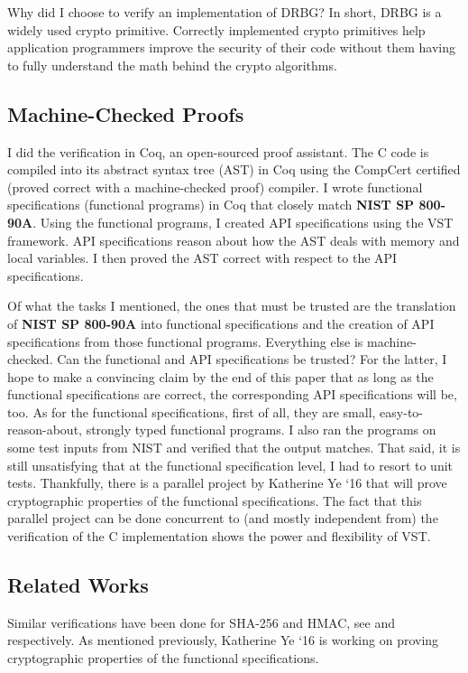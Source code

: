 \documentclass[pageno]{jpaper}
\newcommand{\stdtitle}[1]{\textbf{#1}}
\begin{document}
Why did I choose to verify an implementation of DRBG? In short, DRBG is a widely used crypto primitive. Correctly implemented crypto primitives help application programmers improve the security of their code without them having to fully understand the math behind the crypto algorithms.

\subsection{Machine-Checked Proofs}
I did the verification in Coq, an open-sourced proof assistant. The C code is compiled into its abstract syntax tree (AST) in Coq using the CompCert certified (proved correct with a machine-checked proof) compiler. I wrote functional specifications (functional programs) in Coq that closely match \stdtitle{NIST SP 800-90A}. Using the functional programs, I created API specifications using the VST framework. API specifications reason about how the AST deals with memory and local variables. I then proved the AST correct with respect to the API specifications.

Of what the tasks I mentioned, the ones that must be trusted are the translation of \stdtitle{NIST SP 800-90A} into functional specifications and the creation of API specifications from those functional programs. Everything else is machine-checked. Can the functional and API specifications be trusted? For the latter, I hope to make a convincing claim by the end of this paper that as long as the functional specifications are correct, the corresponding API specifications will be, too. As for the functional specifications, first of all, they are small, easy-to-reason-about, strongly typed functional programs. I also ran the programs on some test inputs from NIST and verified that the output matches. That said, it is still unsatisfying that at the functional specification level, I had to resort to unit tests. Thankfully, there is a parallel project by Katherine Ye ‘16 that will prove cryptographic properties of the functional specifications. The fact that this parallel project can be done concurrent to (and mostly independent from) the verification of the C implementation shows the power and flexibility of VST.

\subsection{Related Works}
Similar verifications have been done for SHA-256 and HMAC, see \cite{sha} and \cite{hmac} respectively. As mentioned previously, Katherine Ye ‘16 is working on proving cryptographic properties of the functional specifications.
\end{document}
